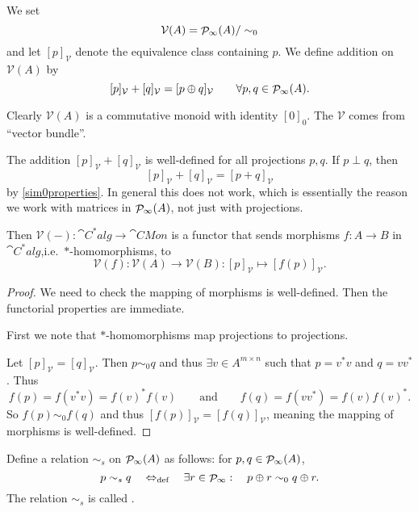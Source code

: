 \begin{definition}
We set
\[ \mathcal{V}(A) = \mathop{\mathcal{P}}\nolimits_\infty(A) / \sim_0 \]
and let $[p]_\mathcal{V}$ denote the equivalence class containing $p$. We define addition on $\mathcal{V}(A)$ by
\[ [p]_\mathcal{V} + [q]_\mathcal{V} = [p\oplus q]_\mathcal{V} \qquad \forall p,q\in\mathop{\mathcal{P}}\nolimits_\infty(A). \]
\end{definition}
Clearly $\mathcal{V}(A)$ is a commutative monoid with identity $[0]_0$. The $\mathcal{V}$ comes from ``vector bundle''.

The addition $[p]_\mathcal{V} + [q]_\mathcal{V}$ is well-defined for all projections $p,q$. If $p\perp q$, then 
\[ [p]_\mathcal{V} + [q]_\mathcal{V} = [p+q]_\mathcal{V} \]
by \ref{sim0properties}. In general this does not work, which is essentially the reason we work with matrices in $\mathop{\mathcal{P}}\nolimits_\infty(A)$, not just with projections.

\begin{lemma}
Then $\mathcal{V}(-): \cat{C^*alg} \to \cat{CMon}$ is a functor that sends morphisms $f: A \to B$ in $\cat{C^*alg}$,i.e.\ $*$-homomorphisms, to
\[  \mathcal{V}(f):\mathcal{V}(A) \to \mathcal{V}(B): [p]_\mathcal{V} \mapsto [f(p)]_\mathcal{V}. \]
\end{lemma}
\begin{proof}
We need to check the mapping of morphisms is well-defined. Then the functorial properties are immediate.

First we note that $*$-homomorphisms map projections to projections.

Let $[p]_\mathcal{V} = [q]_\mathcal{V}$. Then $p\sim_0 q$ and thus $\exists v\in A^{m\times n}$ such that $p=v^*v$ and $q = vv^*$. Thus
\[ f(p) = f(v^*v) = f(v)^*f(v) \qquad \text{and}\qquad f(q) = f(vv^*) = f(v)f(v)^*. \]
So $f(p) \sim_0 f(q)$ and thus $[f(p)]_\mathcal{V} = [f(q)]_\mathcal{V}$, meaning the mapping of morphisms is well-defined.
\end{proof}

\begin{definition}
Define a relation $\sim_s$ on $\mathop{\mathcal{P}}\nolimits_\infty(A)$ as follows: for $p,q\in\mathop{\mathcal{P}}\nolimits_\infty(A)$,
\[ p\sim_s q \quad\Leftrightarrow_{\text{def}}\quad \exists r\in\mathop{\mathcal{P}}\nolimits_\infty:\quad p\oplus r \sim_0 q\oplus r. \]
The relation $\sim_s$ is called .
\end{definition}

